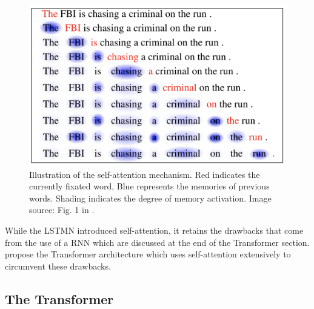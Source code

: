 \documentclass[]{krantz}
\begin{document}
\begin{figure}

{\centering \includegraphics[width=1\linewidth]{figures/02-02-attention-and-self-attention-for-nlp/cheng2016-fig1} 

}

\caption{Illustration of the self-attention mechanism. Red indicates the currently fixated word, Blue represents the memories of previous words. Shading indicates the degree of memory activation. Image source: Fig. 1 in \citep{cheng2016long}.}\label{fig:self-attention-cheng}
\end{figure}

While the LSTMN introduced self-attention, it retains the drawbacks that come from
the use of a RNN which are discussed at the end of the Transformer section. \citet{vaswani2017attention} propose the Transformer architecture which uses
self-attention extensively to circumvent these drawbacks.

\hypertarget{the-transformer}{%
\subsection{The Transformer}\label{the-transformer}}
\end{document}
